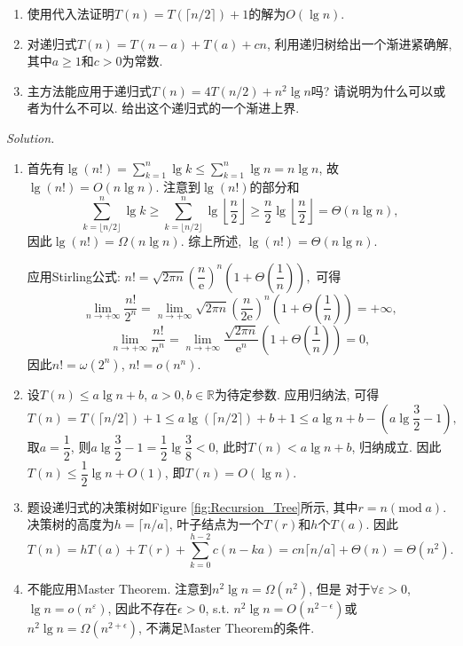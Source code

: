 \documentclass[10pt]{article}
\newcommand{\mr}[1]{\mathrm{#1}}
\newcommand{\mb}[1]{\mathbb{#1}}
\newcommand{\me}{\mathrm{e}}
\begin{document}
\begin{enumerate}
\begin{tcolorbox}
\begin{enumerate}
				\item 使用代入法证明$T(n)=T(\lceil n/2\rceil)+1$的解为$O(\lg n)$.
				\item 对递归式$T(n)=T(n-a)+T(a)+cn$, 利用递归树给出一个渐进紧确解, 其中$a\geqslant 1$和$c>0$为常数.
				\item 主方法能应用于递归式$T(n)=4T(n/2)+n^2\lg n$吗? 请说明为什么可以或者为什么不可以. 给出这个递归式的一个渐进上界.
			\end{enumerate}
		\end{tcolorbox}
		\begin{tcolorbox}[colback=red!20!white]
			\textit{Solution.}\ 
			\begin{enumerate}
				\item 首先有$\lg(n!)=\sum\limits_{k=1}^n\lg k\leqslant\sum\limits_{k=1}^n\lg n=n\lg n$, 故$\lg(n!)=O(n\lg n)$.  注意到$\lg(n!)$的部分和
				$$\sum\limits_{k=\lfloor n/2\rfloor}^n\lg k\geqslant\sum\limits_{k=\lfloor n/2\rfloor}^n\lg\left\lfloor\dfrac{n}{2}\right\rfloor\geqslant\dfrac{n}{2}\lg\left\lfloor\dfrac{n}{2}\right\rfloor=\Theta(n\lg n),$$
				因此$\lg(n!)=\Omega(n\lg n)$. 综上所述, $\lg(n!)=\Theta(n\lg n).$
				
				应用Stirling公式: $n!=\sqrt{2\pi n}\left(\dfrac{n}{\me}\right)^n\left(1+\Theta\left(\dfrac{1}{n}\right)\right),$ 可得
				$$\lim_{n\to+\infty}\dfrac{n!}{2^n}=\lim_{n\to+\infty}\sqrt{2\pi n}\left(\dfrac{n}{2\me}\right)^n\left(1+\Theta\left(\dfrac{1}{n}\right)\right)=+\infty,$$
				$$\lim_{n\to+\infty}\dfrac{n!}{n^n}=\lim_{n\to+\infty}\dfrac{\sqrt{2\pi n}}{\me^n}\left(1+\Theta\left(\dfrac{1}{n}\right)\right)=0,$$
				因此$n!=\omega(2^n)$, $n!=o(n^n)$.
				\item 设$T(n)\leqslant a\lg n+b$, $a>0,b\in\mb{R}$为待定参数. 应用归纳法, 可得
				$$T(n)=T(\lceil n/2\rceil)+1\leqslant a\lg(\lceil n/2\rceil)+b+1\leqslant a\lg n+b-(a\lg\dfrac{3}{2}-1),$$
				取$a=\dfrac{1}{2}$, 则$a\lg\dfrac{3}{2}-1=\dfrac{1}{2}\lg\dfrac{3}{8}<0$, 此时$T(n)<a\lg n+b$, 归纳成立. 因此$T(n)\leqslant\dfrac{1}{2}\lg n+O(1)$, 即$T(n)=O(\lg n)$.
				\item 题设递归式的决策树如Figure \ref{fig:Recursion_Tree}所示, 其中$r=n(\mr{mod}\;a)$. 决策树的高度为$h=\lceil n/a\rceil$, 叶子结点为一个$T(r)$和$h$个$T(a)$. 因此
				$$T(n)=hT(a)+T(r)+\sum\limits_{k=0}^{h-2}c(n-ka)=cn\lceil n/a\rceil+\Theta(n)=\Theta(n^2).$$
				\item 不能应用Master Theorem. 注意到$n^2\lg n=\Omega(n^2)$, 但是 对于$\forall\varepsilon>0$, $\lg n=o(n^{\varepsilon})$, 因此不存在$\epsilon>0$, s.t. $n^2\lg n=O(n^{2-\epsilon})$或$n^2\lg n=\Omega(n^{2+\epsilon})$, 不满足Master Theorem的条件.
				

\end{enumerate}
\end{tcolorbox}
\end{enumerate}
\end{document}
